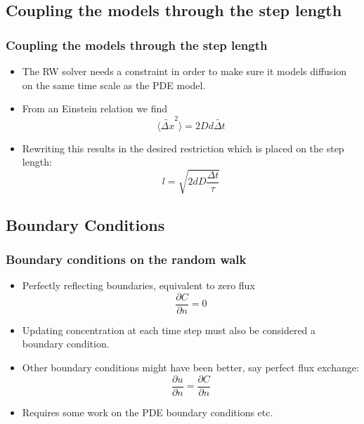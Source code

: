 \documentclass[12pt,a4paper, xcolor={usenames,dvipsnames,svgnames,table}]{beamer}
\renewcommand{\d}{\partial}
\begin{document}
\subsection{Coupling the models through the step length}
\begin{frame}
\frametitle{Coupling the models through the step length}
\begin{itemize}
 \item<1-> The RW solver needs a constraint in order to make sure it models diffusion on the same time scale as the PDE model.
 \item<2-> From an Einstein relation we find
 \begin{equation*}
  \langle\tilde{\Delta x}^2\rangle = 2Dd\tilde{\Delta t}
 \end{equation*}
 \item <4-> Rewriting this results in the desired restriction which is placed on the step length:
 \begin{equation*}
 l = \sqrt{2dD\frac{\Delta t}{\tau}}
\end{equation*}
\end{itemize}

\end{frame}

\subsection{Boundary Conditions}
\begin{frame}
\frametitle{Boundary conditions on the random walk}
\begin{itemize}
 \item<1-> Perfectly reflecting boundaries, equivalent to zero flux
 \begin{equation*}
   \frac{\d C}{\d n} = 0
 \end{equation*}
 \item<2-> Updating concentration at each time step must also be considered a boundary condition.
 \item<3-> Other boundary conditions might have been better, say perfect flux exchange:
 \begin{equation*}
   \frac{\d u}{\d n} = \frac{\d C}{\d n}
 \end{equation*}
 \item<4-> Requires some work on the PDE boundary conditions etc.
\end{itemize}

\end{frame}
\notetoself{}
\end{document}
